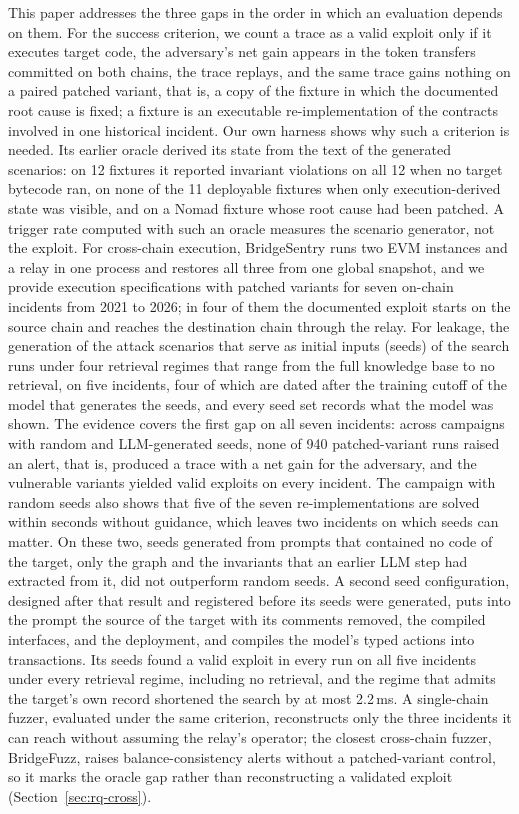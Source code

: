 \documentclass[a4paper]{cas-sc}
\begin{document}
This paper addresses the three gaps in the order in which an evaluation depends on them. For the success criterion, we count a trace as a valid exploit only if it executes target code, the adversary's net gain appears in the token transfers committed on both chains, the trace replays, and the same trace gains nothing on a paired patched variant, that is, a copy of the fixture in which the documented root cause is fixed; a fixture is an executable re-implementation of the contracts involved in one historical incident. Our own harness shows why such a criterion is needed. Its earlier oracle derived its state from the text of the generated scenarios: on 12 fixtures it reported invariant violations on all 12 when no target bytecode ran, on none of the 11 deployable fixtures when only execution-derived state was visible, and on a Nomad fixture whose root cause had been patched. A trigger rate computed with such an oracle measures the scenario generator, not the exploit. For cross-chain execution, BridgeSentry runs two EVM instances and a relay in one process and restores all three from one global snapshot, and we provide execution specifications with patched variants for seven on-chain incidents from 2021 to 2026; in four of them the documented exploit starts on the source chain and reaches the destination chain through the relay. For leakage, the generation of the attack scenarios that serve as initial inputs (seeds) of the search runs under four retrieval regimes that range from the full knowledge base to no retrieval, on five incidents, four of which are dated after the training cutoff of the model that generates the seeds, and every seed set records what the model was shown. The evidence covers the first gap on all seven incidents: across campaigns with random and LLM-generated seeds, none of 940 patched-variant runs raised an alert, that is, produced a trace with a net gain for the adversary, and the vulnerable variants yielded valid exploits on every incident. The campaign with random seeds also shows that five of the seven re-implementations are solved within seconds without guidance, which leaves two incidents on which seeds can matter. On these two, seeds generated from prompts that contained no code of the target, only the graph and the invariants that an earlier LLM step had extracted from it, did not outperform random seeds. A second seed configuration, designed after that result and registered before its seeds were generated, puts into the prompt the source of the target with its comments removed, the compiled interfaces, and the deployment, and compiles the model's typed actions into transactions. Its seeds found a valid exploit in every run on all five incidents under every retrieval regime, including no retrieval, and the regime that admits the target's own record shortened the search by at most 2.2\,ms. A single-chain fuzzer, evaluated under the same criterion, reconstructs only the three incidents it can reach without assuming the relay's operator; the closest cross-chain fuzzer, BridgeFuzz, raises balance-consistency alerts without a patched-variant control, so it marks the oracle gap rather than reconstructing a validated exploit (Section~\ref{sec:rq-cross}).
\end{document}
